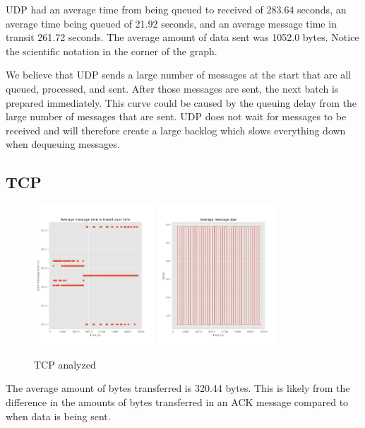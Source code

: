 \documentclass[a4paper,12pt]{article}
\begin{document}
UDP had an average time from being queued to received of 283.64 seconds, an
average time being queued of 21.92 seconds, and an average message time in
transit 261.72 seconds. The average amount of data sent was 1052.0 bytes. Notice
the scientific notation in the corner of the graph.

We believe that UDP sends a large number of messages at the start that are all queued, processed, and sent. After those messages are sent, the next batch is prepared immediately. This curve could be caused by the queuing delay from the large number of messages that are sent. UDP does not wait for messages to be received and will therefore create a large backlog which slows everything down when dequeuing messages.

\subsection{TCP}

\begin{figure}[h]
  \centering
  \includegraphics[width=0.4\textwidth]{media/tcp.png}
  \includegraphics[width=0.4\textwidth]{media/tcp_data.png}
  \caption{TCP analyzed}
\end{figure}

The average amount of bytes transferred is 320.44 bytes. This is likely from the
difference in the amounts of bytes transferred in an ACK message compared to
when data is being sent.
\end{document}
